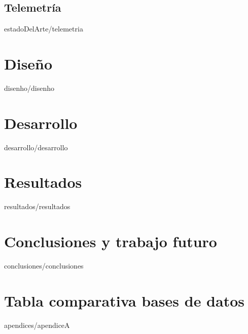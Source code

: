 \documentclass[epsbased, copyright, final, covers, overleaf, printable, extendedindex, firstnumbered, tfg]{tfgtfmthesisuam}
\begin{document}
  \section{Telemetría\label{SEC:TELEMETRIA}}{estadoDelArte/telemetria}

\chapter{Diseño\label{CAP:DISENHO}}{disenho/disenho}

\chapter{Desarrollo\label{CAP:DESARROLLO}}{desarrollo/desarrollo}

\chapter{Resultados\label{CAP:RESULTADOS}}{resultados/resultados}

\chapter{Conclusiones y trabajo futuro\label{CAP:CONCLUSIONES}}{conclusiones/conclusiones}

\appendix

\chapter{Tabla comparativa bases de datos\label{appendix:bases_de_datos}}{apendices/apendiceA}
\end{document}
